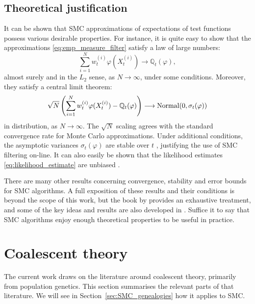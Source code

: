 \subsection{Theoretical justification}
\label{sec:SMC_theory}
It can be shown that SMC approximations of expectations of test functions possess various desirable properties. For instance, it is quite easy to show that the approximations \eqref{eq:emp_measure_filter} satisfy a law of large numbers:
\begin{equation*}
\sum_{i=1}^N w_t^{(i)} \varphi( X_t^{(i)} ) 
\longrightarrow \mathbb{Q}_t(\varphi) ,
\end{equation*}
almost surely and in the $L_2$ sense, as $N\to\infty$, under some conditions\seb{[citation]}.
Moreover, they satisfy a central limit theorem:
\begin{equation*}
\sqrt{N} \left( \sum_{i=1}^N w_t^{(i)} \varphi( X_t^{(i)} ) - \mathbb{Q}_t(\varphi) \right)
\longrightarrow  \operatorname{Normal}( 0, \sigma_t(\varphi) )
\end{equation*}
in distribution, as $N\to\infty$\seb{[citation]}. 
The $\sqrt{N}$ scaling agrees with the standard convergence rate for Monte Carlo approximations.
Under additional conditions, the asymptotic variances $\sigma_t(\varphi)$ are stable over $t$ \parencite[Proposition 11.13]{chopin2020}, justifying the use of SMC filtering on-line.
It can also easily be shown that the likelihood estimates \eqref{eq:likelihood_estimate} are unbiased \parencite[see for example][Proposition 16.3]{chopin2020}.

There are many other results concerning convergence, stability and error bounds for SMC algorithms. A full exposition of these results and their conditions is beyond the scope of this work, but the book by \textcite{delmoral2013} provides an exhaustive treatment, and some of the key ideas and results are also developed in \textcite[Chapter 11]{chopin2020}.
Suffice it to say that SMC algorithms enjoy enough theoretical properties to be useful in practice.





\section{Coalescent theory}
\label{sec:coaltheory}
The current work draws on the literature around coalescent theory, primarily from population genetics. This section summarises the relevant parts of that literature. We will see in Section~\ref{sec:SMC_genealogies} how it applies to SMC.

